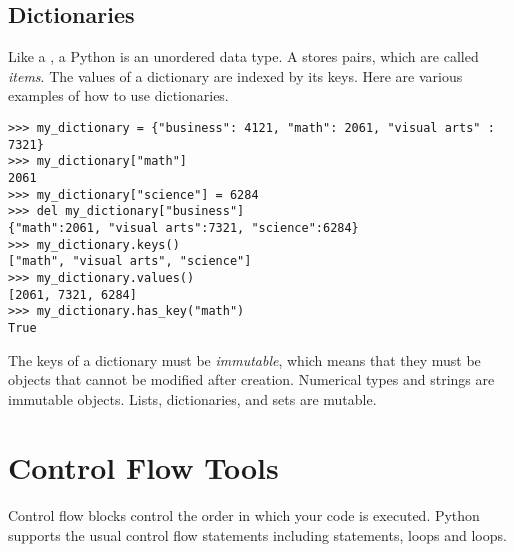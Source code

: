 

\subsection*{Dictionaries}
Like a , a Python  is an unordered data type.  A  stores  pairs, which are called \emph{items}. The values of a dictionary are indexed by its keys.  Here are various examples of how to use dictionaries.
\begin{lstlisting}
>>> my_dictionary = {"business": 4121, "math": 2061, "visual arts" : 7321} 
>>> my_dictionary["math"]
2061
>>> my_dictionary["science"] = 6284
>>> del my_dictionary["business"]
{"math":2061, "visual arts":7321, "science":6284}
>>> my_dictionary.keys()
["math", "visual arts", "science"]
>>> my_dictionary.values()
[2061, 7321, 6284]
>>> my_dictionary.has_key("math")
True
\end{lstlisting}

The keys of a dictionary must be \emph{immutable}, which means that they must be objects that cannot be modified after creation. Numerical types and strings are immutable objects. Lists, dictionaries, and sets are mutable.

%


\section*{Control Flow Tools}
Control flow blocks control the order in which your code is executed.
Python supports the usual control flow statements 
including  statements,  loops and  loops. 

